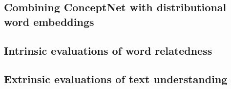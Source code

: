 \documentclass[letterpaper]{article}
\begin{document}
\subsection{Combining ConceptNet with distributional word embeddings}

\subsection{Intrinsic evaluations of word relatedness}
\label{intrinsic-evaluations}

\subsection{Extrinsic evaluations of text understanding}
\label{extrinsic-evaluations}


%




\end{document}
